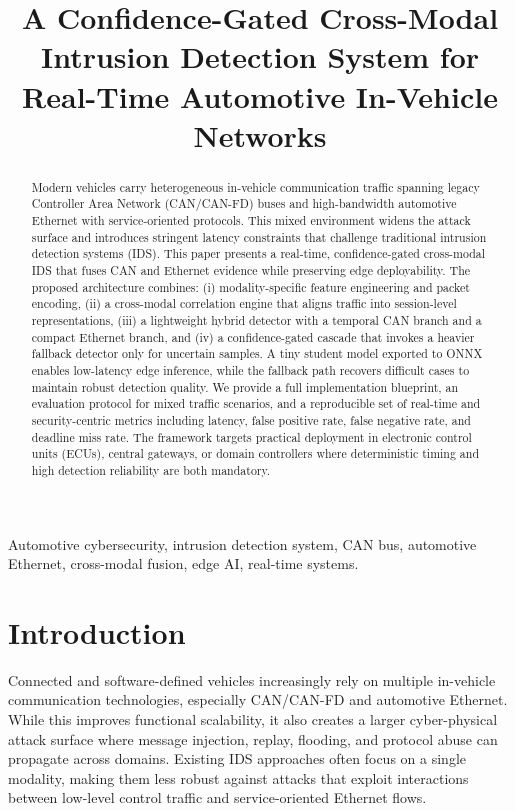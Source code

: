\documentclass[conference]{IEEEtran}
\title{A Confidence-Gated Cross-Modal Intrusion Detection System for Real-Time Automotive In-Vehicle Networks}
\author{%
\IEEEauthorblockN{Author One, Author Two, Author Three}
\IEEEauthorblockA{Department/Institute Name\\
City, Country\\
email1@domain.com, email2@domain.com, email3@domain.com}
}
\begin{document}
\maketitle

\begin{abstract}
Modern vehicles carry heterogeneous in-vehicle communication traffic spanning legacy Controller Area Network (CAN/CAN-FD) buses and high-bandwidth automotive Ethernet with service-oriented protocols. This mixed environment widens the attack surface and introduces stringent latency constraints that challenge traditional intrusion detection systems (IDS). This paper presents a real-time, confidence-gated cross-modal IDS that fuses CAN and Ethernet evidence while preserving edge deployability. The proposed architecture combines: (i) modality-specific feature engineering and packet encoding, (ii) a cross-modal correlation engine that aligns traffic into session-level representations, (iii) a lightweight hybrid detector with a temporal CAN branch and a compact Ethernet branch, and (iv) a confidence-gated cascade that invokes a heavier fallback detector only for uncertain samples. A tiny student model exported to ONNX enables low-latency edge inference, while the fallback path recovers difficult cases to maintain robust detection quality. We provide a full implementation blueprint, an evaluation protocol for mixed traffic scenarios, and a reproducible set of real-time and security-centric metrics including latency, false positive rate, false negative rate, and deadline miss rate. The framework targets practical deployment in electronic control units (ECUs), central gateways, or domain controllers where deterministic timing and high detection reliability are both mandatory.
\end{abstract}

\begin{IEEEkeywords}
Automotive cybersecurity, intrusion detection system, CAN bus, automotive Ethernet, cross-modal fusion, edge AI, real-time systems.
\end{IEEEkeywords}

\section{Introduction}
Connected and software-defined vehicles increasingly rely on multiple in-vehicle communication technologies, especially CAN/CAN-FD and automotive Ethernet. While this improves functional scalability, it also creates a larger cyber-physical attack surface where message injection, replay, flooding, and protocol abuse can propagate across domains. Existing IDS approaches often focus on a single modality, making them less robust against attacks that exploit interactions between low-level control traffic and service-oriented Ethernet flows.
\end{document}

